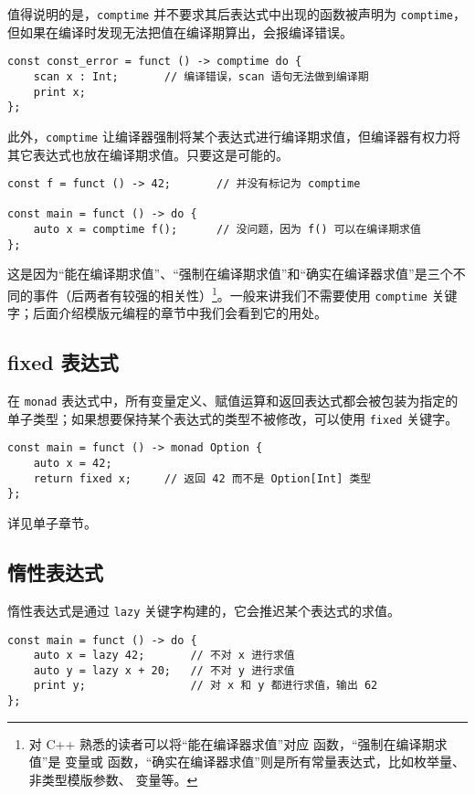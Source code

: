 值得说明的是，\lstinline!comptime! 并不要求其后表达式中出现的函数被声明为 \lstinline!comptime!，但如果在编译时发现无法把值在编译期算出，会报编译错误。

\begin{lstlisting}
const const_error = funct () -> comptime do {
    scan x : Int;       // 编译错误，scan 语句无法做到编译期
    print x;
};
\end{lstlisting}

此外，\lstinline!comptime! 让编译器强制将某个表达式进行编译期求值，但编译器有权力将其它表达式也放在编译期求值。只要这是可能的。

\begin{lstlisting}
const f = funct () -> 42;		// 并没有标记为 comptime

const main = funct () -> do {
	auto x = comptime f();		// 没问题，因为 f() 可以在编译期求值
};
\end{lstlisting}

这是因为“能在编译期求值”、“强制在编译期求值”和“确实在编译器求值”是三个不同的事件（后两者有较强的相关性）\footnote{对 C++ 熟悉的读者可以将“能在编译器求值”对应  函数，“强制在编译期求值”是  变量或  函数，“确实在编译器求值”则是所有常量表达式，比如枚举量、非类型模版参数、 变量等。}。一般来讲我们不需要使用 \lstinline!comptime! 关键字；后面介绍模版元编程的章节中我们会看到它的用处。

\subsection{fixed 表达式}

在 \lstinline!monad! 表达式中，所有变量定义、赋值运算和返回表达式都会被包装为指定的单子类型；如果想要保持某个表达式的类型不被修改，可以使用 \lstinline!fixed! 关键字。

\begin{lstlisting}
const main = funct () -> monad Option {
	auto x = 42;
	return fixed x;		// 返回 42 而不是 Option[Int] 类型
};
\end{lstlisting}

详见单子章节。

\subsection{惰性表达式}

惰性表达式是通过 \lstinline!lazy! 关键字构建的，它会推迟某个表达式的求值。

\begin{lstlisting}
const main = funct () -> do {
    auto x = lazy 42;       // 不对 x 进行求值
    auto y = lazy x + 20;   // 不对 y 进行求值
    print y;                // 对 x 和 y 都进行求值，输出 62
};
\end{lstlisting}

